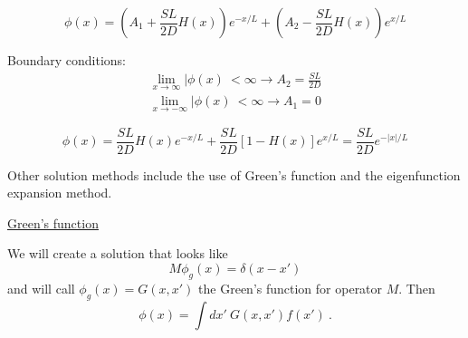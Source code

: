 \documentclass[12pt]{article}
\newcommand{\rvec}{\ensuremath{\vec{r}}}
\newcommand{\vecr}{\ensuremath{\vec{r}}}
\begin{document}
\begin{equation*}
\phi(x) = \left(A_1 + \frac{SL}{2D}H(x)\right)e^{-x/L} + \left(A_2 - \frac{SL}{2D}H(x)\right)e^{x/L}
\end{equation*}

Boundary conditions:
\vspace{-5 mm}
\begin{gather*}
\lim\limits_{x\to\infty}|\phi(x)\ < \infty \rightarrow A_2 = \frac{SL}{2D} \\
\lim\limits_{x\to-\infty}|\phi(x)\ < \infty \rightarrow A_1 = 0
\end{gather*}

\begin{equation*}
\phi(x) = \frac{SL}{2D}H(x)e^{-x/L} + \frac{SL}{2D}[1-H(x)]e^{x/L} = \frac{SL}{2D}e^{-|x|/L}
\end{equation*}

Other solution methods include the use of Green's function and the eigenfunction expansion method.

\underline{Green's function}

We will create a solution that looks like
\[M\phi_g(x) = \delta(x-x')\]
and will call $\phi_g(x) = G(x,x')$ the Green's function for operator $M$. Then
\[\phi(x) = \int dx' \: G(x,x') f(x')\:.\]

%
%
%
%
%
%
%
\end{document}
